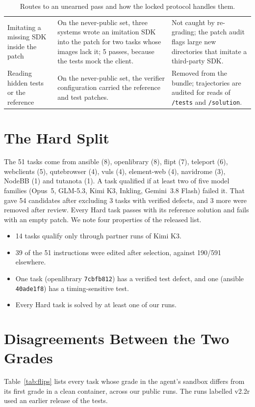 \begin{table}[t]
\begin{tabularx}{\textwidth}{@{}>{\raggedright\arraybackslash}p{}>{\raggedright\arraybackslash}X>{\raggedright\arraybackslash}p{}@{}}
\addlinespace
Imitating a missing SDK inside the patch & On the never-public set, three systems wrote an imitation SDK into the patch for two tasks whose images lack it; 5 passes, because the tests mock the client. & Not caught by re-grading; the patch audit flags large new directories that imitate a third-party SDK. \\
\addlinespace
Reading hidden tests or the reference & On the never-public set, the verifier configuration carried the reference and test patches. & Removed from the bundle; trajectories are audited for reads of \texttt{/tests} and \texttt{/solution}. \\
\bottomrule
\end{tabularx}
\caption{Routes to an unearned pass and how the locked protocol handles them.}
\label{tab:exploits}
\end{table}

\section{The Hard Split}
\label{app:hard}
The 51 tasks come from ansible (8), openlibrary (8), flipt (7), teleport (6), webclients (5), qutebrowser (4), vuls (4), element-web (4), navidrome (3), NodeBB (1) and tutanota (1). A task qualified if at least two of five model families (Opus~5, GLM-5.3, Kimi K3, Inkling, Gemini~3.8 Flash) failed it. That gave 54 candidates after excluding 3 tasks with verified defects, and 3 more were removed after review. Every Hard task passes with its reference solution and fails with an empty patch. We note four properties of the released list.
\begin{itemize}\setlength\itemsep{0pt}
\item 14 tasks qualify only through partner runs of Kimi K3.
\item 39 of the 51 instructions were edited after selection, against 190/591 elsewhere.
\item One task (openlibrary \texttt{7cbfb812}) has a verified test defect, and one (ansible \texttt{40ade1f8}) has a timing-sensitive test.
\item Every Hard task is solved by at least one of our runs.
\end{itemize}

\section{Disagreements Between the Two Grades}
\label{app:flips}
Table~\ref{tab:flips} lists every task whose grade in the agent's sandbox differs from its first grade in a clean container, across our public runs. The runs labelled v2.2r used an earlier release of the tests.

